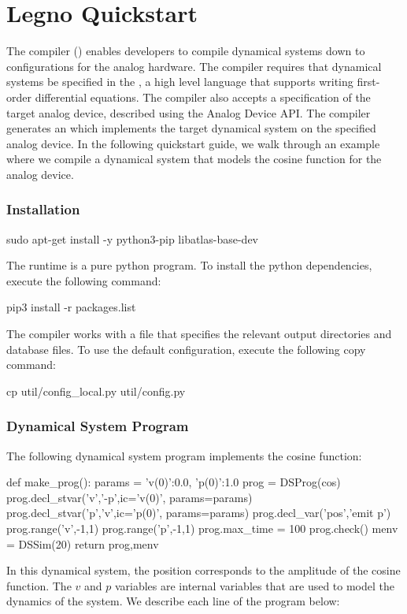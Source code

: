 \chapter{Legno Quickstart}

The \legno compiler () enables developers to compile dynamical
systems down to configurations for the analog hardware. The \legno compiler
requires that dynamical systems be specified in the , a high level language that supports writing first-order
differential equations. The \legno compiler also accepts a specification of the
target analog device, described using the Analog Device API. The \legno compiler
generates an  which implements the target dynamical
system on the specified analog device. In the following quickstart guide, we
walk through an example where we compile a dynamical system that models the
cosine function for the \hcdc analog device. 

\subsection{Installation}

\begin{snippet}
  sudo apt-get install -y python3-pip libatlas-base-dev
\end{snippet}

The \grendel runtime is a pure python program. To install the python
dependencies, execute the following command:

\begin{snippet}
  pip3 install -r packages.list
\end{snippet}

The \legno compiler works with a 
file that specifies the relevant output directories and database files. To use
the default configuration, execute the following copy command:

\begin{snippet}
cp util/config_local.py util/config.py
\end{snippet}

\subsection{Dynamical System Program}
The following dynamical system program implements the cosine function:
\begin{dssnippet}
def make_prog():
  params = {
    'v(0)':0.0,
    'p(0)':1.0
  }
  prog = DSProg(cos)
  prog.decl_stvar('v','-p',ic='{v(0)}', params=params)
  prog.decl_stvar('p','v',ic='{p(0)}', params=params)
  prog.decl_var('pos','emit p')
  prog.range('v',-1,1)
  prog.range('p',-1,1)
  prog.max_time = 100
  prog.check()
  menv = DSSim(20)
  return prog,menv
  
\end{dssnippet}
In this dynamical system, the position  corresponds to the amplitude of
the cosine function. The $v$ and $p$ variables are internal variables that are
used to model the dynamics of the system. We describe each line of the program
below:

